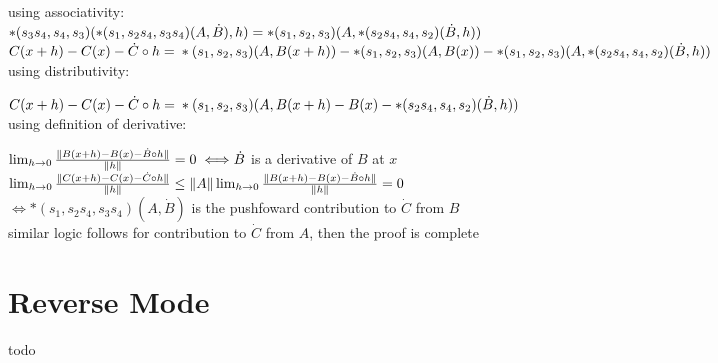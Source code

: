\documentclass[8pt]{extarticle}
\begin{document}
\begin{multicols*}{2}
  using associativity:\\
  $*(s_3 s_4, s_4, s_3)(*(s_1, s_2 s_4, s_3 s_4)(A, \dot{B}), h)\\ = *(s_1, s_2, s_3)(A, *(s_2 s_4, s_4, s_2)(\dot{B}, h))$\\

  $C(x+h) - C(x) - \dot{C} \circ h =\\
  *(s_1, s_2, s_3)(A, B(x+h))\\
  - *(s_1, s_2, s_3)(A, B(x))\\
  - *(s_1, s_2, s_3)(A, *(s_2 s_4, s_4, s_2)(\dot{B}, h))$\\

  using distributivity:

  $C(x+h) - C(x) - \dot{C} \circ h =\\
  *(s_1, s_2, s_3)(A, B(x+h) - B(x) - *(s_2 s_4, s_4, s_2)(\dot{B}, h))$\\

  using definition of derivative:

  $\lim_{h \rightarrow 0} \frac{\| B(x+h) - B(x) - \dot{B} \circ h \|}{\|h\|} = 0 \iff \\ \dot{B}$ is a derivative of $B$ at $x$\\

  $\lim_{h \rightarrow 0} \frac{\| C(x+h) - C(x) - \dot{C} \circ h \|}{\|h\|} \\ \leq \|A\| \lim_{h \rightarrow 0} \frac{\| B(x+h) - B(x) - \dot{B} \circ h \|}{\|h\|} = 0$\\
  $\iff *(s_1, s_2 s_4, s_3 s_4)(A, \dot{B})$ is the pushfoward contribution to $\dot{C}$ from $B$\\

  similar logic follows for contribution to $\dot{C}$ from $A$, then the proof is complete
  
  \vfill\null
  \columnbreak
    
  \section{Reverse Mode}
  todo
  
\end{multicols*}
\end{document}
